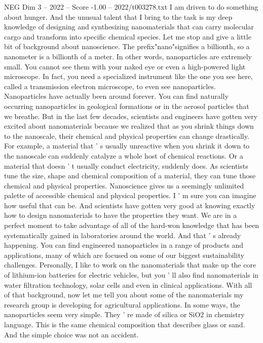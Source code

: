 \begin{textsample}{NEG Dim 3 – 2022 – Score -1.00 – 2022/t003278.txt}
I am driven to do something about hunger.
And the unusual talent that I bring to the task is my deep knowledge of designing and synthesizing nanomaterials that can carry molecular cargo and transform into specific chemical species.
Let me stop and give a little bit of background about nanoscience.
The prefix"nano"signifies a billionth, so a nanometer is a billionth of a meter.
In other words, nanoparticles are extremely small.
You cannot see them with your naked eye or even a high-powered light microscope.
In fact, you need a specialized instrument like the one you see here, called a transmission electron microscope, to even see nanoparticles.
Nanoparticles have actually been around forever.
You can find naturally occurring nanoparticles in geological formations or in the aerosol particles that we breathe.
But in the last few decades, scientists and engineers have gotten very excited about nanomaterials because we realized that as you shrink things down to the nanoscale, their chemical and physical properties can change drastically.
For example, a material that ' s usually unreactive when you shrink it down to the nanoscale can suddenly catalyze a whole host of chemical reactions.
Or a material that doesn ' t usually conduct electricity, suddenly does.
As scientists tune the size, shape and chemical composition of a material, they can tune those chemical and physical properties.
Nanoscience gives us a seemingly unlimited palette of accessible chemical and physical properties.
I ' m sure you can imagine how useful that can be.
And scientists have gotten very good at knowing exactly how to design nanomaterials to have the properties they want.
We are in a perfect moment to take advantage of all of the hard-won knowledge that has been systematically gained in laboratories around the world.
And that ' s already happening.
You can find engineered nanoparticles in a range of products and applications, many of which are focused on some of our biggest sustainability challenges.
Personally, I like to work on the nanomaterials that make up the core of lithium-ion batteries for electric vehicles, but you ' ll also find nanomaterials in water filtration technology, solar cells and even in clinical applications.
With all of that background, now let me tell you about some of the nanomaterials my research group is developing for agricultural applications.
In some ways, the nanoparticles seem very simple.
They ' re made of silica or SiO2 in chemistry language.
This is the same chemical composition that describes glass or sand.
And the simple choice was not an accident.

\end{textsample}
